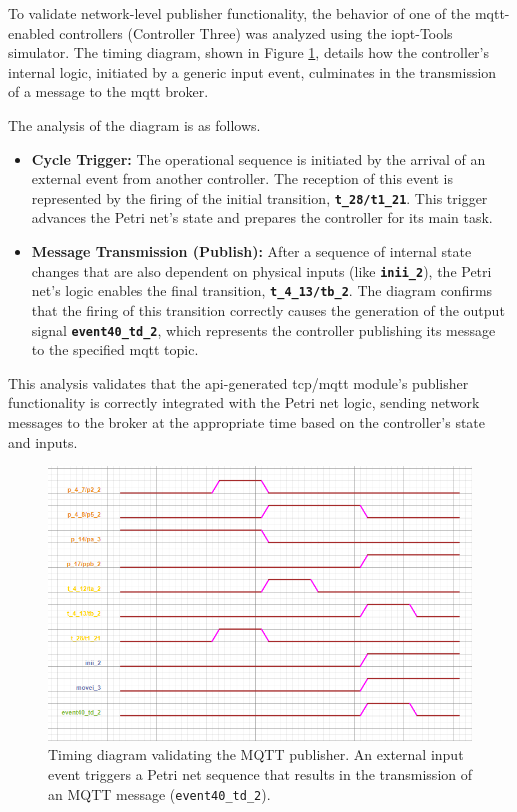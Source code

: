 To validate network-level publisher functionality, the behavior of one of the \gls{mqtt}-enabled controllers (Controller Three) was analyzed using the \gls{iopt}-Tools simulator. The timing diagram, shown in Figure \ref{fig:timing_diagram_tcp}, details how the controller's internal logic, initiated by a generic input event, culminates in the transmission of a message to the \gls{mqtt} broker.

The analysis of the diagram is as follows.
\begin{itemize}
    \item \textbf{Cycle Trigger:} The operational sequence is initiated by the arrival of an external event from another controller. The reception of this event is represented by the firing of the initial transition, \textbf{\texttt{t\_28/t1\_21}}. This trigger advances the Petri net's state and prepares the controller for its main task.

    \item \textbf{Message Transmission (Publish):} After a sequence of internal state changes that are also dependent on physical inputs (like \textbf{\texttt{inii\_2}}), the Petri net's logic enables the final transition, \textbf{\texttt{t\_4\_13/tb\_2}}. The diagram confirms that the firing of this transition correctly causes the generation of the output signal \textbf{\texttt{event40\_td\_2}}, which represents the controller publishing its message to the specified \gls{mqtt} topic.
\end{itemize}

This analysis validates that the \gls{api}-generated \gls{tcp}/\gls{mqtt} module's publisher functionality is correctly integrated with the Petri net logic, sending network messages to the broker at the appropriate time based on the controller's state and inputs.

\begin{figure}[htb!]
    \centering
    \includegraphics[width=\columnwidth]{Chapters/Figures/timing_diagram_tcp.png}
    \caption{Timing diagram validating the MQTT publisher. An external input event triggers a Petri net sequence that results in the transmission of an MQTT message (\texttt{event40\_td\_2}).}
    \label{fig:timing_diagram_tcp}
\end{figure}

